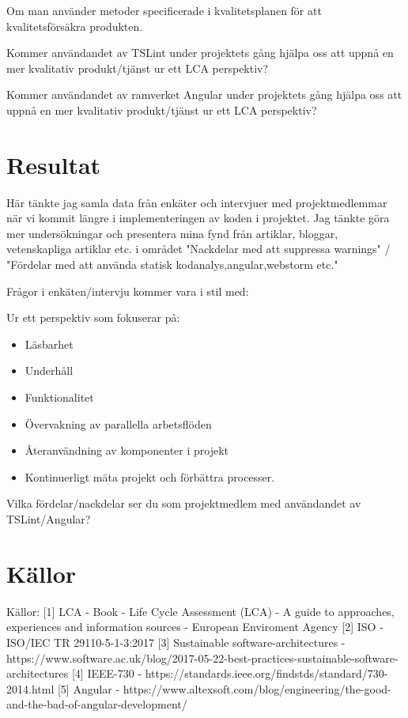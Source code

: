 Om man använder metoder specificerade i kvalitetsplanen för att kvalitetsförsäkra produkten. 

Kommer användandet av TSLint under projektets gång hjälpa oss att uppnå en mer kvalitativ produkt/tjänst ur ett LCA perspektiv?

Kommer användandet av ramverket Angular under projektets gång hjälpa oss att uppnå en mer kvalitativ produkt/tjänst ur ett LCA perspektiv?

\section{Resultat}
Här tänkte jag samla data från enkäter och intervjuer med projektmedlemmar när vi kommit längre i implementeringen av koden i projektet.
Jag tänkte göra mer undersökningar och presentera mina fynd från artiklar, bloggar, vetenskapliga artiklar etc. i området "Nackdelar med att suppressa warnings" / "Fördelar med att använda statisk kodanalys,angular,webstorm etc."

Frågor i enkäten/intervju kommer vara i stil med:

Ur ett perspektiv som fokuserar på: 
\begin{itemize}
	\item Läsbarhet 
	\item Underhåll
	\item Funktionalitet
	\item Övervakning av parallella arbetsflöden
	\item Återanvändning av komponenter i projekt
	\item Kontinuerligt mäta projekt och förbättra processer.
\end{itemize}

Vilka fördelar/nackdelar ser du som projektmedlem med användandet av TSLint/Angular?



\section{Källor}

Källor:
[1] LCA - Book - Life Cycle Assessment (LCA) - A guide to approaches, experiences and information sources - European Enviroment Agency
[2] ISO - ISO/IEC TR 29110-5-1-3:2017
[3] Sustainable software-architectures -  https://www.software.ac.uk/blog/2017-05-22-best-practices-sustainable-software-architectures
[4] IEEE-730 - https://standards.ieee.org/findstds/standard/730-2014.html
[5] Angular - https://www.altexsoft.com/blog/engineering/the-good-and-the-bad-of-angular-development/
